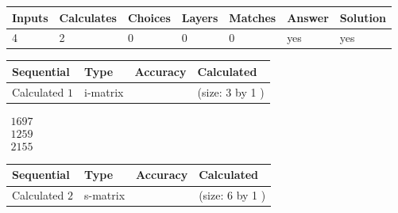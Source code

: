 \documentclass[12pt]{article}
\begin{document}
 
 
\noindent{}
 
 

 
 
 
\noindent{}
 
 

 
 
\noindent{}
 
 

 
\vspace{0.3in}
   
   
   
   
\noindent\begin{tabular}{|l|l|l|l|l|l|l|}
 \hline
Inputs & Calculates & Choices & Layers & Matches & Answer & Solution \\ \hline
 4  & 
 2  & 
 0
  & 
 0  & 
 0  & 
  yes & 
  yes 
  \\ \hline
 \end{tabular}
   
   
   
   
\noindent{}
   
   
  
  
\noindent\begin{tabular}{|l|l|l|l|}
\hline
 Sequential & Type & Accuracy & Calculated \\ 
\hline
 
 
  Calculated $  1 $ & i-matrix &  & 
 (size:  3  by  1 )
 \\  \hline  
 \end{tabular}
   
   
$\begin{array}{
 c
 }
 1697  \\ 
 1259  \\ 
 2155
 \end{array}  $ 
  
  
\noindent\begin{tabular}{|l|l|l|l|}
\hline
 Sequential & Type & Accuracy & Calculated \\ 
\hline
 
 
  Calculated $  2 $ & s-matrix & & 
 (size:  6  by  1 )
 \\  \hline  
 \end{tabular}
   
\end{document}
